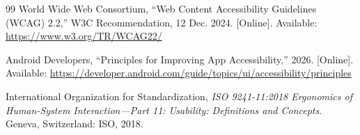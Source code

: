\documentclass{article}
\begin{document}
\begin{thebibliography}{99}
 World Wide Web Consortium, ``Web Content Accessibility Guidelines (WCAG) 2.2,'' W3C Recommendation, 12 Dec. 2024. [Online]. Available: \url{https://www.w3.org/TR/WCAG22/}

 Android Developers, ``Principles for Improving App Accessibility,'' 2026. [Online]. Available: \url{https://developer.android.com/guide/topics/ui/accessibility/principles}

 International Organization for Standardization, \emph{ISO 9241-11:2018 Ergonomics of Human-System Interaction---Part 11: Usability: Definitions and Concepts}. Geneva, Switzerland: ISO, 2018.

\end{thebibliography}
\end{document}
